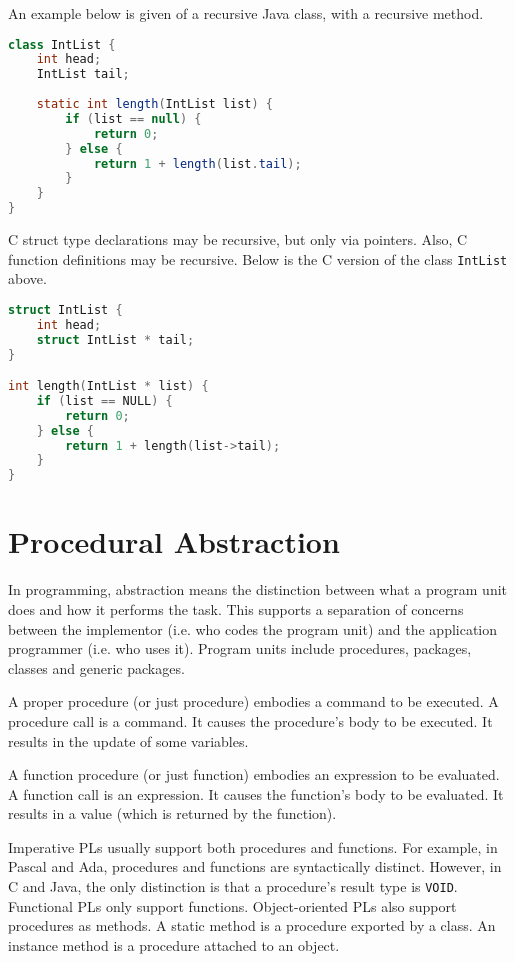 \documentclass[a4paper, openany]{memoir}
\begin{document}
An example below is given of a recursive Java class, with a recursive method.
\begin{lstlisting}[language=Java]
class IntList {
    int head;
    IntList tail;
    
    static int length(IntList list) {
        if (list == null) {
            return 0;
        } else {
            return 1 + length(list.tail);
        }
    }
}
\end{lstlisting}
C struct type declarations may be recursive, but only via pointers. Also, C function definitions may be recursive. Below is the C version of the class \texttt{IntList} above.
\begin{lstlisting}[language=C]
struct IntList {
    int head;
    struct IntList * tail;
}

int length(IntList * list) {
    if (list == NULL) {
        return 0;
    } else {
        return 1 + length(list->tail);
    }
}
\end{lstlisting}
\newpage

\section{Procedural Abstraction}
In programming, abstraction means the distinction between what a program unit does and how it performs the task. This supports a separation of concerns between the implementor (i.e. who codes the program unit) and the application programmer (i.e. who uses it). Program units include procedures, packages, classes and generic packages.

A proper procedure (or just procedure) embodies a command to be executed. A procedure call is a command. It causes the procedure's body to be executed. It results in the update of some variables.

A function procedure (or just function) embodies an expression to be evaluated. A function call is an expression. It causes the function's body to be evaluated. It results in a value (which is returned by the function).

Imperative PLs usually support both procedures and functions. For example, in Pascal and Ada, procedures and functions are syntactically distinct. However, in C and Java, the only distinction is that a procedure's result type is \texttt{VOID}. Functional PLs only support functions. Object-oriented PLs also support procedures as methods. A static method is a procedure exported by a class. An instance method is a procedure attached to an object.
\end{document}
